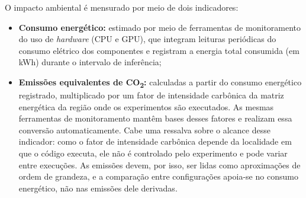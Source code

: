 {O impacto ambiental é mensurado por meio de dois indicadores:

\begin{itemize}
    \item \textbf{Consumo energético:} estimado por meio de ferramentas de monitoramento do
          uso de \textit{hardware} (CPU e GPU), que integram leituras periódicas do consumo
          elétrico dos componentes e registram a energia total consumida (em kWh) durante
          o intervalo de inferência;

    \item \textbf{Emissões equivalentes de CO\textsubscript{2}:} calculadas a partir do
          consumo energético registrado, multiplicado por um fator de intensidade carbônica
          da matriz energética da região onde os experimentos são executados. As mesmas
          ferramentas de monitoramento mantêm bases desses fatores e realizam essa
          conversão automaticamente.
          Cabe uma ressalva sobre o alcance desse indicador: como o fator de intensidade
          carbônica depende da localidade em que o código executa, ele não é controlado pelo
          experimento e pode variar entre execuções. As emissões devem, por isso, ser lidas
          como aproximações de ordem de grandeza, e a comparação entre configurações
          apoia-se no consumo energético, não nas emissões dele derivadas.
\end{itemize}





}

